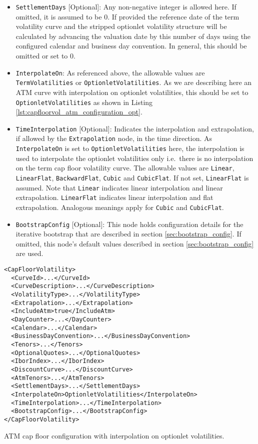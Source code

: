 \begin{itemize}
\item \lstinline!SettlementDays! [Optional]:
Any non-negative integer is allowed here. If omitted, it is assumed to be 0. If provided the reference date of the term volatility curve and the stripped optionlet volatility structure will be calculated by advancing the valuation date by this number of days using the configured calendar and business day convention. In general, this should be omitted or set to 0.

\item \lstinline!InterpolateOn!:
As referenced above, the allowable values are \lstinline!TermVolatilities! or \lstinline!OptionletVolatilities!. As we are describing here an ATM curve with interpolation on optionlet volatilities, this should be set to \lstinline!OptionletVolatilities! as shown in Listing \ref{lst:capfloorvol_atm_configuration_opt}.

\item \lstinline!TimeInterpolation! [Optional]:
Indicates the interpolation and extrapolation, if allowed by the \lstinline!Extrapolation! node, in the time direction. As \lstinline!InterpolateOn! is set to \lstinline!OptionletVolatilities! here, the interpolation is used to interpolate the optionlet volatilities only i.e.\ there is no interpolation on the term cap floor volatility curve. The allowable values are \lstinline!Linear!, \lstinline!LinearFlat!, \lstinline!BackwardFlat!, \lstinline!Cubic! and \lstinline!CubicFlat!. If not set, \lstinline!LinearFlat! is assumed. Note that \lstinline!Linear! indicates linear interpolation and linear extrapolation. \lstinline!LinearFlat! indicates linear interpolation and flat extrapolation. Analogous meanings apply for \lstinline!Cubic! and \lstinline!CubicFlat!.

\item \lstinline!BootstrapConfig! [Optional]:
This node holds configuration details for the iterative bootstrap that are described in section \ref{sec:bootstrap_config}. If omitted, this node's default values described in section \ref{sec:bootstrap_config} are used.

\end{itemize}

\begin{longlisting}
\begin{verbatim}
<CapFloorVolatility>
  <CurveId>...</CurveId>
  <CurveDescription>...</CurveDescription>
  <VolatilityType>...</VolatilityType>
  <Extrapolation>...</Extrapolation>
  <IncludeAtm>true</IncludeAtm>
  <DayCounter>...</DayCounter>
  <Calendar>...</Calendar>
  <BusinessDayConvention>...</BusinessDayConvention>
  <Tenors>...</Tenors>
  <OptionalQuotes>...</OptionalQuotes>
  <IborIndex>...</IborIndex>
  <DiscountCurve>...</DiscountCurve>
  <AtmTenors>...</AtmTenors>
  <SettlementDays>...</SettlementDays>
  <InterpolateOn>OptionletVolatilities</InterpolateOn>
  <TimeInterpolation>...</TimeInterpolation>
  <BootstrapConfig>...</BootstrapConfig>
</CapFloorVolatility>
\end{verbatim}
\caption{ATM cap floor configuration with interpolation on optionlet volatilities.}
\label{lst:capfloorvol_atm_configuration_opt}
\end{longlisting}

